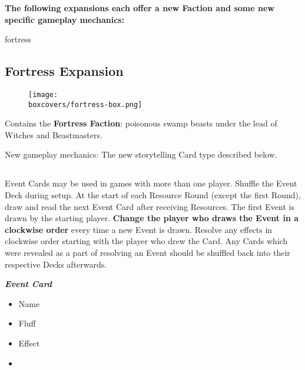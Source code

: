 \textbf{The following expansions each offer a new Faction and some new specific gameplay mechanics:}
\begin{multicols}{2}
\begin{expansion}[title=]{fortress}
  \subsection*{\color{fortress}Fortress Expansion}
  \setlength\intextsep{0pt}
  \setlength\columnsep{0.8em}
  \begin{wrapfigure}{l}{0.35\textwidth}
      \texttt{[image: \\boxcovers/fortress-box.png]}
  \end{wrapfigure}
  Contains the \textbf{Fortress Faction}: poisonous swamp beasts under the lead of Witches and Beastmasters.\par
  \medskip
  New gameplay mechanics: The new storytelling Card type described below.
  \medskip
  \subsection*{}
  Event Cards may be used in games with more than one player.
  Shuffle the Event Deck during setup.
  At the start of each Resource Round (except the first Round), draw and read the next Event Card after receiving Resources.
  The first Event is drawn by the starting player.
  \textbf{Change the player who draws the Event in a clockwise order} every time a new Event is drawn.
  Resolve any effects in clockwise order starting with the player who drew the Card.
  Any Cards which were revealed as a part of resolving an Event should be shuffled back into their respective Decks afterwards.

  \medskip

  \begin{minipage}[h]{\linewidth}
  \vspace{0.1pt}
  \centering
  \begin{scriptsize}
  \end{scriptsize}
  \footnotesize
  \textbf{\textit{\textcolor{darkcandyapplered}{Event Card}}}
  \begin{multicols}{2}
    \begin{itemize}
    \item[\textbf{1.}] Name
    \item[\textbf{2.}] Fluff
    \item[\textbf{3.}] Effect
    \item[\textbf{\phantom{.}}] \phantom{.}
    \end{itemize}
  \end{multicols}
  \end{minipage}
\end{expansion}


\end{multicols}
